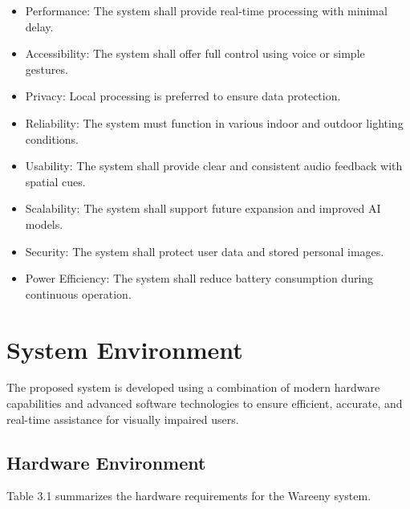 \documentclass[12pt,a4paper]{report}
\begin{document}
\begin{itemize}
  \item Performance: The system shall provide real-time processing with minimal delay.
  \item Accessibility: The system shall offer full control using voice or simple gestures.
  \item Privacy: Local processing is preferred to ensure data protection.
  \item Reliability: The system must function in various indoor and outdoor lighting conditions.
  \item Usability: The system shall provide clear and consistent audio feedback with spatial cues.
  \item Scalability: The system shall support future expansion and improved AI models.
  \item Security: The system shall protect user data and stored personal images.
  \item Power Efficiency: The system shall reduce battery consumption during continuous operation.
\end{itemize}

\section{System Environment}

The proposed system is developed using a combination of modern hardware capabilities and advanced software technologies to ensure efficient, accurate, and real-time assistance for visually impaired users.

\subsection{Hardware Environment}

Table 3.1 summarizes the hardware requirements for the Wareeny system.
\end{document}

